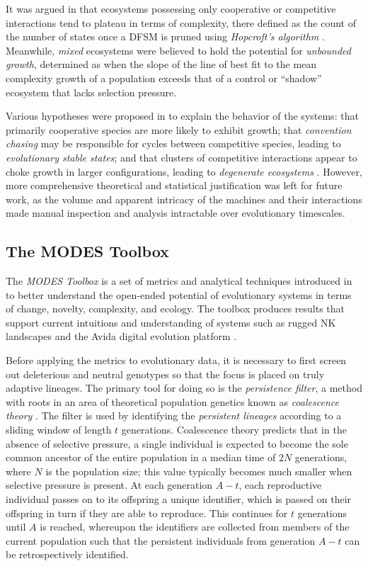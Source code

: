 \documentclass[letterpaper]{article}
\begin{document}
It was argued in \cite{moran2019} that ecosystems possessing only cooperative or competitive interactions tend to plateau in terms of complexity, there defined as the count of the number of states once a DFSM is pruned using \textit{Hopcroft's algorithm} \citep{Hopcroft1971AnNL}. Meanwhile, \textit{mixed} ecosystems were believed to hold the potential for \textit{unbounded growth}, determined as when the slope of the line of best fit to the mean complexity growth of a population exceeds that of a control or ``shadow'' ecosystem that lacks selection pressure. 

Various hypotheses were proposed in \cite{moran2019} to explain the behavior of the systems: that primarily cooperative species are more likely to exhibit growth; that \textit{convention chasing} may be responsible for cycles between competitive species, leading to \textit{evolutionary stable states}; and that clusters of competitive interactions appear to choke growth in larger configurations, leading to \textit{degenerate ecosystems} \citep{ficici1998, watson2002}. However, more comprehensive theoretical and statistical justification was left for future work, as the volume and apparent intricacy of the machines and their interactions made manual inspection and analysis intractable over evolutionary timescales. 

\subsection{The MODES Toolbox}
The \textit{MODES Toolbox} is a set of metrics and analytical techniques introduced in \cite{dolson2019} to better understand the open-ended potential of evolutionary systems in terms of change, novelty, complexity, and ecology. The toolbox produces results that support current intuitions and understanding of systems such as rugged NK landscapes and the Avida digital evolution platform \citep{Lenski2003TheEO, KAUFFMAN198711}. 

Before applying the metrics to evolutionary data, it is necessary to first screen out deleterious and neutral genotypes so that the focus is placed on truly adaptive lineages. The primary tool for doing so is the \textit{persistence filter}, a method with roots in an area of theoretical population genetics known as \textit{coalescence theory} \citep{Fu1999CoalescingIT}. The filter is used by identifying the \textit{persistent lineages} according to a sliding window of length $t$ generations. Coalescence theory predicts that in the absence of selective pressure, a single individual is expected to become the sole common ancestor of the entire population in a median time of $2N$ generations, where $N$ is the population size; this value typically becomes much smaller when selective pressure is present. At each generation $A - t$, each reproductive individual passes on to its offspring a unique identifier, which is passed on their offspring in turn if they are able to reproduce. This continues for $t$ generations until $A$ is reached, whereupon the identifiers are collected from members of the current population such that the persistent individuals from generation $A - t$ can be retrospectively identified.
\end{document}
